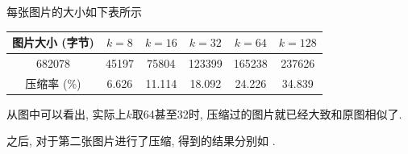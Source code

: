 \documentclass[lang=cn,11pt]{elegantpaper}
\begin{document}
每张图片的大小如下表所示
\begin{table}[h]
    \centering
    \begin{tabular}{c|ccccc}
    \hline
    图片大小 (字节)  & $k=8$   & $k=16$   & $k=32$   & $k=64$   & $k=128$  \\ \hline
    682078   & 45197 & 75804  & 123399 & 165238 & 237626 \\
    压缩率 (\%) & 6.626 & 11.114 & 18.092 & 24.226 & 34.839 \\ \hline
    \end{tabular}
\end{table}

从图中可以看出, 实际上$k$取64甚至32时, 压缩过的图片就已经大致和原图相似了. 

之后, 对于第二张图片进行了压缩, 得到的结果分别如 .
\end{document}

